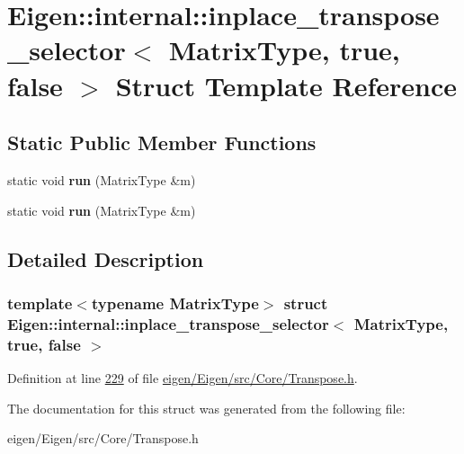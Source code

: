 \hypertarget{struct_eigen_1_1internal_1_1inplace__transpose__selector_3_01_matrix_type_00_01true_00_01false_01_4}{}\section{Eigen\+:\+:internal\+:\+:inplace\+\_\+transpose\+\_\+selector$<$ Matrix\+Type, true, false $>$ Struct Template Reference}
\label{struct_eigen_1_1internal_1_1inplace__transpose__selector_3_01_matrix_type_00_01true_00_01false_01_4}
\subsection*{Static Public Member Functions}
\begin{DoxyCompactItemize}
\item 
\mbox{\label{struct_eigen_1_1internal_1_1inplace__transpose__selector_3_01_matrix_type_00_01true_00_01false_01_4_afa7c98bff0d27a49ff1edf9173307705}} 
static void {\bfseries run} (Matrix\+Type \&m)
\item 
\mbox{\label{struct_eigen_1_1internal_1_1inplace__transpose__selector_3_01_matrix_type_00_01true_00_01false_01_4_afa7c98bff0d27a49ff1edf9173307705}} 
static void {\bfseries run} (Matrix\+Type \&m)
\end{DoxyCompactItemize}


\subsection{Detailed Description}
\subsubsection*{template$<$typename Matrix\+Type$>$\newline
struct Eigen\+::internal\+::inplace\+\_\+transpose\+\_\+selector$<$ Matrix\+Type, true, false $>$}



Definition at line \hyperlink{eigen_2_eigen_2src_2_core_2_transpose_8h_source_l00229}{229} of file \hyperlink{eigen_2_eigen_2src_2_core_2_transpose_8h_source}{eigen/\+Eigen/src/\+Core/\+Transpose.\+h}.



The documentation for this struct was generated from the following file\+:\begin{DoxyCompactItemize}
\item 
eigen/\+Eigen/src/\+Core/\+Transpose.\+h\end{DoxyCompactItemize}
